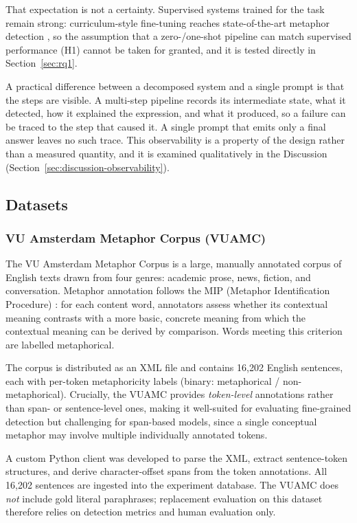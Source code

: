 That expectation is not a certainty. Supervised systems trained for the task
remain strong: curriculum-style fine-tuning reaches state-of-the-art metaphor
detection \cite{Jia2024}, so the assumption that a zero-/one-shot pipeline can
match supervised performance (H1) cannot be taken for granted, and it is tested
directly in Section~\ref{sec:rq1}.

A practical difference between a decomposed system and a single prompt is that
the steps are visible. A multi-step pipeline records its intermediate state,
what it detected, how it explained the expression, and what it produced, so a
failure can be traced to the step that caused it. A single prompt that emits
only a final answer leaves no such trace. This observability is a property of
the design rather than a measured quantity, and it is examined qualitatively in
the Discussion (Section~\ref{sec:discussion-observability}).

\subsection{Datasets}

\subsubsection{VU Amsterdam Metaphor Corpus (VUAMC)}

The VU Amsterdam Metaphor Corpus \cite{vuamsterdammetaphorcorpus} is a large, manually annotated corpus of English texts drawn from four genres: academic prose, news, fiction, and conversation. Metaphor annotation follows the MIP (Metaphor Identification Procedure) \cite{mipvu}: for each content word, annotators assess whether its contextual meaning contrasts with a more basic, concrete meaning from which the contextual meaning can be derived by comparison. Words meeting this criterion are labelled metaphorical.

The corpus is distributed as an XML file and contains 16{,}202 English sentences, each with per-token metaphoricity labels (binary: metaphorical / non-metaphorical). Crucially, the VUAMC provides \textit{token-level} annotations rather than span- or sentence-level ones, making it well-suited for evaluating fine-grained detection but challenging for span-based models, since a single conceptual metaphor may involve multiple individually annotated tokens.

A custom Python client was developed to parse the XML, extract sentence-token structures, and derive character-offset spans from the token annotations. All 16{,}202 sentences are ingested into the experiment database. The VUAMC does \textit{not} include gold literal paraphrases; replacement evaluation on this dataset therefore relies on detection metrics and human evaluation only.

